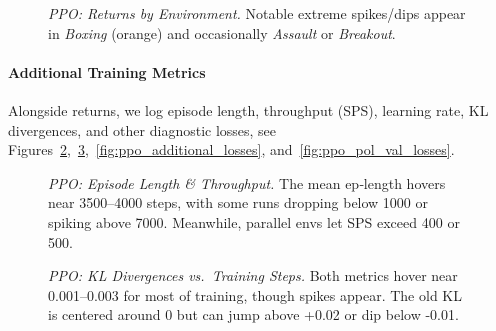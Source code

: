 \begin{figure} 
	\centering
	\quad
	\caption{\emph{PPO: Returns by Environment.} 
		Notable extreme spikes/dips appear in \emph{Boxing} (orange) 
		and occasionally \emph{Assault} or \emph{Breakout}.}
	\label{fig:ppo_returns_pergame}
\end{figure}

\paragraph{Additional Training Metrics}
Alongside returns, we log episode length, throughput (SPS), learning rate, KL divergences, and other diagnostic losses, see Figures~\ref{fig:ppo_epilen_sps},~\ref{fig:ppo_bothkl},~\ref{fig:ppo_additional_losses}, and~\ref{fig:ppo_pol_val_losses}.

\begin{figure} 
	\centering
	\quad
	\caption{\emph{PPO: Episode Length \& Throughput.}
		The mean ep‐length hovers near 3500--4000 steps, 
		with some runs dropping below 1000 or spiking above 7000. 
		Meanwhile, parallel envs let SPS exceed 400 or 500.}
	\label{fig:ppo_epilen_sps}
\end{figure}

\begin{figure} 
	\centering
	\quad
	\caption{\emph{PPO: KL Divergences vs.\ Training Steps.}
		Both metrics hover near 0.001--0.003 for most of training, 
		though spikes appear. The old KL is centered around 0 but can jump above +0.02 or dip below -0.01.}
	\label{fig:ppo_bothkl}
\end{figure}

